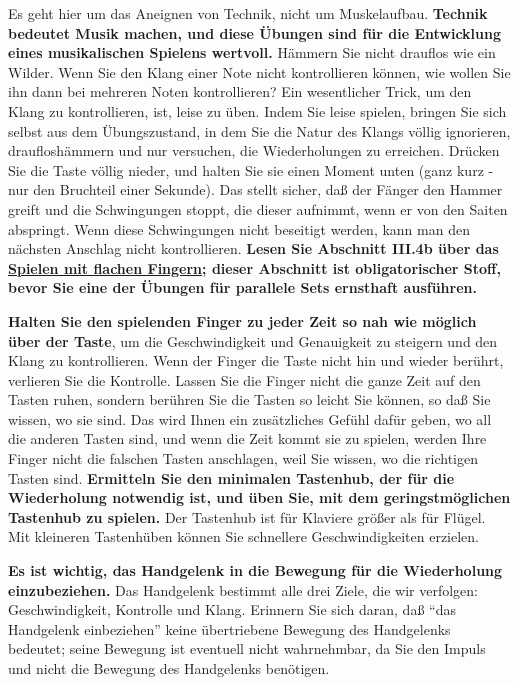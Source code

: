 Es geht hier um das Aneignen von Technik, nicht um Muskelaufbau.
\textbf{Technik bedeutet Musik machen, und diese Übungen sind für die Entwicklung eines musikalischen Spielens wertvoll.}
Hämmern Sie nicht drauflos wie ein Wilder.
Wenn Sie den Klang einer Note nicht kontrollieren können, wie wollen Sie ihn dann bei mehreren Noten kontrollieren?
Ein wesentlicher Trick, um den Klang zu kontrollieren, ist, leise zu üben.
Indem Sie leise spielen, bringen Sie sich selbst aus dem Übungszustand, in dem Sie die Natur des Klangs völlig ignorieren, draufloshämmern und nur versuchen, die Wiederholungen zu erreichen.
Drücken Sie die Taste völlig nieder, und halten Sie sie einen Moment unten (ganz kurz - nur den Bruchteil einer Sekunde).
Das stellt sicher, daß der Fänger den Hammer greift und die Schwingungen stoppt, die dieser aufnimmt, wenn er von den Saiten abspringt.
Wenn diese Schwingungen nicht beseitigt werden, kann man den nächsten Anschlag nicht kontrollieren.
\textbf{Lesen Sie Abschnitt III.4b über das \hyperlink{c1iii4b}{Spielen mit flachen Fingern}; dieser Abschnitt ist obligatorischer Stoff, bevor Sie eine der Übungen für parallele Sets ernsthaft ausführen.}

\textbf{Halten Sie den spielenden Finger zu jeder Zeit so nah wie möglich über der Taste}, um die Geschwindigkeit und Genauigkeit zu steigern und den Klang zu kontrollieren.
Wenn der Finger die Taste nicht hin und wieder berührt, verlieren Sie die Kontrolle.
Lassen Sie die Finger nicht die ganze Zeit auf den Tasten ruhen, sondern berühren Sie die Tasten so leicht Sie können, so daß Sie wissen, wo sie sind.
Das wird Ihnen ein zusätzliches Gefühl dafür geben, wo all die anderen Tasten sind, und wenn die Zeit kommt sie zu spielen, werden Ihre Finger nicht die falschen Tasten anschlagen, weil Sie wissen, wo die richtigen Tasten sind.
\textbf{Ermitteln Sie den minimalen Tastenhub, der für die Wiederholung notwendig ist, und üben Sie, mit dem geringstmöglichen Tastenhub zu spielen.}
Der Tastenhub ist für Klaviere größer als für Flügel.
Mit kleineren Tastenhüben können Sie schnellere Geschwindigkeiten erzielen.

\textbf{Es ist wichtig, das Handgelenk in die Bewegung für die Wiederholung einzubeziehen.}
Das Handgelenk bestimmt alle drei Ziele, die wir verfolgen: Geschwindigkeit, Kontrolle und Klang.
Erinnern Sie sich daran, daß \enquote{das Handgelenk einbeziehen} keine übertriebene Bewegung des Handgelenks bedeutet; seine Bewegung ist eventuell nicht wahrnehmbar, da Sie den Impuls und nicht die Bewegung des Handgelenks benötigen.

